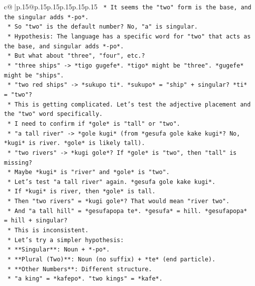 \documentclass{article}
\begin{document}
{\begin{supertabular}{c@{$\;$}|p{.15\linewidth}@{}p{.15\linewidth}p{.15\linewidth}p{.15\linewidth}p{.15\linewidth}p{.15\linewidth}}
{{{\texttt{        *   It seems the "two" form is the base, and the singular adds *{-}po*.} \\
\texttt{        *   So "two" is the default number? No, "a" is singular.} \\
\texttt{        *   Hypothesis: The language has a specific word for "two" that acts as the base, and singular adds *{-}po*.} \\
\texttt{        *   But what about "three", "four", etc.?} \\
\texttt{        *   "three ships" {-}> *tigo gugefe*. *tigo* might be "three". *gugefe* might be "ships".} \\
\texttt{        *   "two red ships" {-}> *sukupo ti*. *sukupo* = "ship" + singular? *ti* = "two"?} \\
\texttt{        *   This is getting complicated. Let's test the adjective placement and the "two" word specifically.} \\
\texttt{        *   I need to confirm if *gole* is "tall" or "two".} \\
\texttt{        *   "a tall river" {-}> *gole kugi* (from *gesufa gole kake kugi*? No, *kugi* is river. *gole* is likely tall).} \\
\texttt{        *   "two rivers" {-}> *kugi gole*? If *gole* is "two", then "tall" is missing?} \\
\texttt{        *   Maybe *kugi* is "river" and *gole* is "two".} \\
\texttt{        *   Let's test "a tall river" again. *gesufa gole kake kugi*.} \\
\texttt{        *   If *kugi* is river, then *gole* is tall.} \\
\texttt{        *   Then "two rivers" = *kugi gole*? That would mean "river two".} \\
\texttt{        *   And "a tall hill" = *gesufapopa te*. *gesufa* = hill. *gesufapopa* = hill + singular?} \\
\texttt{        *   This is inconsistent.} \\
\texttt{        *   Let's try a simpler hypothesis:} \\
\texttt{            *   **Singular**: Noun + *{-}po*.} \\
\texttt{            *   **Plural (Two)**: Noun (no suffix) + *te* (end particle).} \\
\texttt{            *   **Other Numbers**: Different structure.} \\
\texttt{            *   "a king" = *kafepo*. "two kings" = *kafe*.} \\
}}}
\end{supertabular}}
\end{document}
